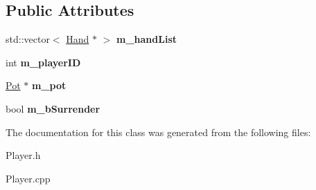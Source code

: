 \subsection*{Public Attributes}
\begin{DoxyCompactItemize}
\item 
std\+::vector$<$ \hyperlink{class_hand}{Hand} $\ast$ $>$ {\bfseries m\+\_\+hand\+List}\hypertarget{class_player_ac4ef2a880d80f353a4a96391516d5629}{}\label{class_player_ac4ef2a880d80f353a4a96391516d5629}

\item 
int {\bfseries m\+\_\+player\+ID}\hypertarget{class_player_a82caa9879f5233e641dda10a41d9186f}{}\label{class_player_a82caa9879f5233e641dda10a41d9186f}

\item 
\hyperlink{class_pot}{Pot} $\ast$ {\bfseries m\+\_\+pot}\hypertarget{class_player_a16264ed3055966735e372567d594d538}{}\label{class_player_a16264ed3055966735e372567d594d538}

\item 
bool {\bfseries m\+\_\+b\+Surrender}\hypertarget{class_player_ae7736ed56c6057fbaf60330a110dd818}{}\label{class_player_ae7736ed56c6057fbaf60330a110dd818}

\end{DoxyCompactItemize}


The documentation for this class was generated from the following files\+:\begin{DoxyCompactItemize}
\item 
Player.\+h\item 
Player.\+cpp\end{DoxyCompactItemize}
